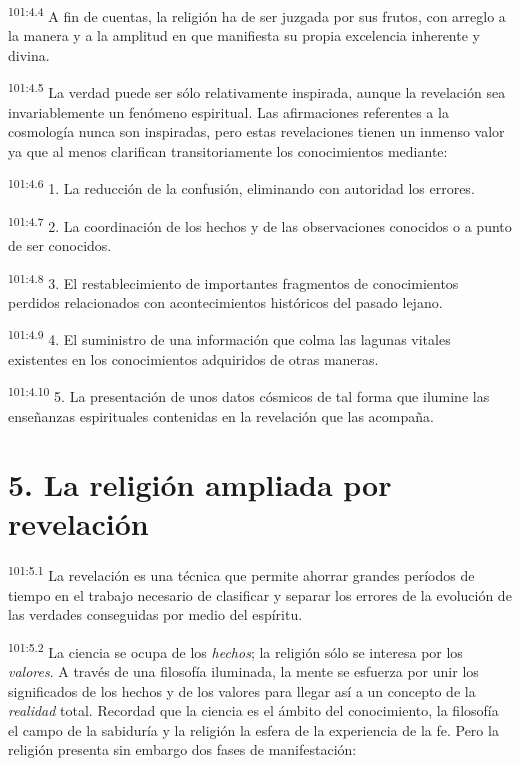\documentclass[twoside, 11pt]{book}
\begin{document}
\par
\textsuperscript{101:4.4} A fin de cuentas, la religión ha de ser juzgada por sus frutos, con arreglo a la manera y a la amplitud en que manifiesta su propia excelencia inherente y divina.

\par
\textsuperscript{101:4.5} La verdad puede ser sólo relativamente inspirada, aunque la revelación sea invariablemente un fenómeno espiritual. Las afirmaciones referentes a la cosmología nunca son inspiradas, pero estas revelaciones tienen un inmenso valor ya que al menos clarifican transitoriamente los conocimientos mediante:

\par
\textsuperscript{101:4.6} 1. La reducción de la confusión, eliminando con autoridad los errores.

\par
\textsuperscript{101:4.7} 2. La coordinación de los hechos y de las observaciones conocidos o a punto de ser conocidos.

\par
\textsuperscript{101:4.8} 3. El restablecimiento de importantes fragmentos de conocimientos perdidos relacionados con acontecimientos históricos del pasado lejano.

\par
\textsuperscript{101:4.9} 4. El suministro de una información que colma las lagunas vitales existentes en los conocimientos adquiridos de otras maneras.

\par
\textsuperscript{101:4.10} 5. La presentación de unos datos cósmicos de tal forma que ilumine las enseñanzas espirituales contenidas en la revelación que las acompaña.

\section*{5. La religión ampliada por revelación}
\par
\textsuperscript{101:5.1} La revelación es una técnica que permite ahorrar grandes períodos de tiempo en el trabajo necesario de clasificar y separar los errores de la evolución de las verdades conseguidas por medio del espíritu.

\par
\textsuperscript{101:5.2} La ciencia se ocupa de los \textit{hechos}; la religión sólo se interesa por los \textit{valores}. A través de una filosofía iluminada, la mente se esfuerza por unir los significados de los hechos y de los valores para llegar así a un concepto de la \textit{realidad} total. Recordad que la ciencia es el ámbito del conocimiento, la filosofía el campo de la sabiduría y la religión la esfera de la experiencia de la fe. Pero la religión presenta sin embargo dos fases de manifestación:
\end{document}
